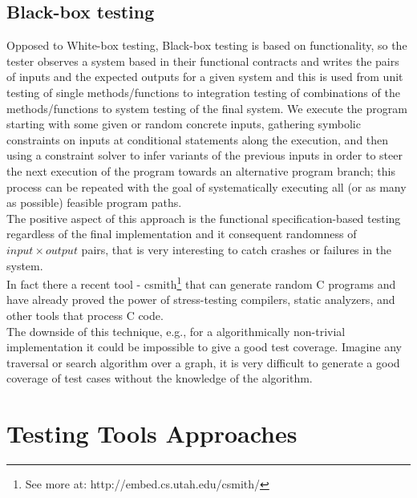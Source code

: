 \documentclass[citeauthoryear]{llncs}
\begin{document}
\subsection{Black-box testing}
Opposed to White-box testing, Black-box testing is based on functionality, so the tester observes a system based in their functional contracts and writes the
pairs of inputs and the expected outputs for a given system and this is used from unit testing of single methods/functions to integration testing
of combinations of the methods/functions to system testing of the final system.
We execute the program starting with some given or random concrete inputs, gathering symbolic constraints on inputs at conditional statements along the execution,
and then using a constraint solver to infer variants of the previous inputs in order to steer the next execution of the program
towards an alternative program branch; this process can be repeated with the goal of systematically executing all (or as many as possible) feasible program paths.\\
The positive aspect of this approach is the functional specification-based testing
regardless of the final implementation and it consequent randomness of $input \times output$ pairs, that is very interesting to catch crashes or failures in the system.\\
In fact there a recent tool - csmith\footnote{See more at: http://embed.cs.utah.edu/csmith/} that can generate random C programs and have already proved
the power of stress-testing compilers, static analyzers, and other tools that process C code\cite{Yang:2011:FUB:1993316.1993532}.\\
The downside of this technique, e.g., for a algorithmically non-trivial implementation it could be impossible to give a good test coverage.
Imagine any traversal or search algorithm over a graph, it is very difficult to generate a good coverage of test cases without the knowledge of the algorithm.

\section{Testing Tools Approaches}
\end{document}
